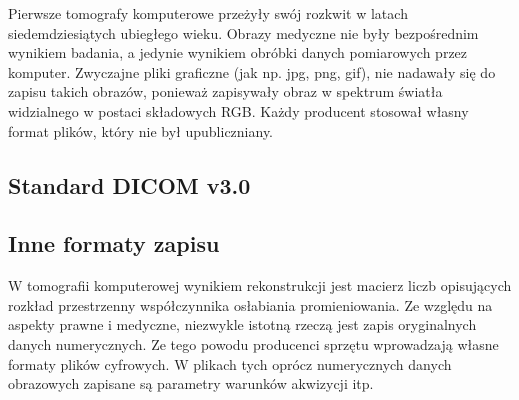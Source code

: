 
\par
Pierwsze tomografy komputerowe przeżyły swój rozkwit w latach siedemdziesiątych ubiegłego wieku.
Obrazy medyczne nie były bezpośrednim wynikiem badania, a jedynie wynikiem obróbki danych pomiarowych przez komputer.
Zwyczajne pliki graficzne (jak np. jpg, png, gif), nie nadawały się do zapisu takich obrazów, ponieważ zapisywały obraz w spektrum światła widzialnego w postaci składowych RGB.
Każdy producent stosował  własny format plików, który nie był upubliczniany.

\subsection{Standard DICOM v3.0}


\subsection{Inne formaty zapisu}

\par
W tomografii komputerowej wynikiem rekonstrukcji jest macierz liczb opisujących rozkład przestrzenny współczynnika osłabiania promieniowania.
Ze względu na aspekty prawne i medyczne, niezwykle istotną rzeczą jest zapis oryginalnych danych numerycznych. Ze tego powodu producenci sprzętu wprowadzają własne formaty plików cyfrowych.
W plikach tych oprócz numerycznych danych obrazowych zapisane są parametry warunków akwizycji itp.